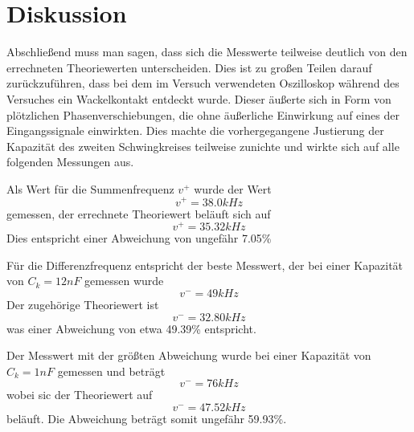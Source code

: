 \section{Diskussion}
\label{sec:Diskussion}
Abschließend muss man sagen, dass sich die Messwerte teilweise deutlich von den errechneten Theoriewerten unterscheiden. Dies ist zu großen Teilen darauf zurückzuführen, dass bei
dem im Versuch verwendeten Oszilloskop während des Versuches ein Wackelkontakt entdeckt wurde. Dieser äußerte sich in Form von plötzlichen Phasenverschiebungen, die ohne äußerliche
Einwirkung auf eines der Eingangssignale einwirkten. Dies machte die vorhergegangene Justierung der Kapazität des zweiten Schwingkreises teilweise zunichte und wirkte sich auf alle
folgenden Messungen aus.

Als Wert für die Summenfrequenz $ v^{+} $ wurde der Wert
\begin{equation}
    v^{+} = 38.0 kHz
\end{equation}
gemessen, der errechnete Theoriewert beläuft sich auf
\begin{equation}
    v^{+} = 35.32 kHz
\end{equation}
Dies entspricht einer Abweichung von ungefähr 7.05\%

Für die Differenzfrequenz entspricht der beste Messwert, der bei einer Kapazität von $C_k = 12 nF$ gemessen wurde
\begin{equation}
    v^{-} = 49 kHz
\end{equation}
Der zugehörige Theoriewert ist
\begin{equation}
    v^{-} = 32.80 kHz
\end{equation}
was einer Abweichung von etwa 49.39\% entspricht.

Der Messwert mit der größten Abweichung wurde bei einer Kapazität von $C_k = 1 nF$ gemessen und beträgt
\begin{equation}
    v^{-} = 76 kHz
\end{equation}
wobei sic der Theoriewert auf
\begin{equation}
    v^{-} = 47.52 kHz
\end{equation}
beläuft. Die Abweichung beträgt somit ungefähr 59.93\%.